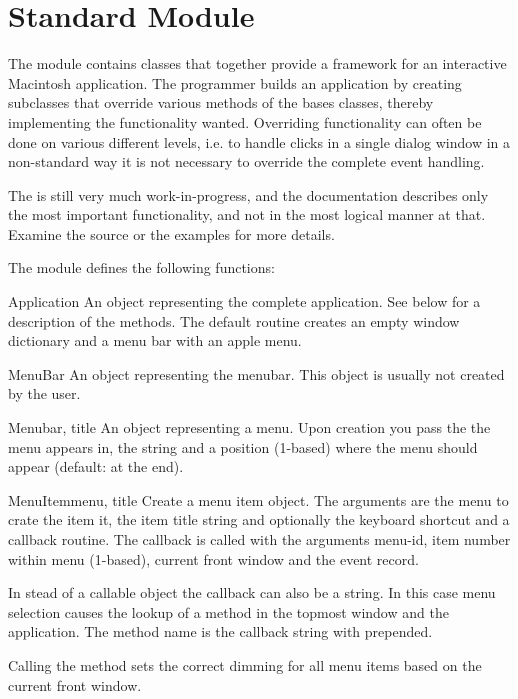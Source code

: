 \section{Standard Module }



The  module contains classes that together provide a
framework for an interactive Macintosh application. The programmer
builds an application by creating subclasses that override various
methods of the bases classes, thereby implementing the functionality
wanted. Overriding functionality can often be done on various
different levels, i.e. to handle clicks in a single dialog window in a
non-standard way it is not necessary to override the complete event
handling.

The  is still very much work-in-progress, and the
documentation describes only the most important functionality, and not
in the most logical manner at that. Examine the source or the examples
for more details.

The  module defines the following functions:


\begin{funcdesc}{Application}{}
An object representing the complete application. See below for a
description of the methods. The default  routine
creates an empty window dictionary and a menu bar with an apple menu.
\end{funcdesc}

\begin{funcdesc}{MenuBar}{}
An object representing the menubar. This object is usually not created
by the user.
\end{funcdesc}

\begin{funcdesc}{Menu}{bar, title}
An object representing a menu. Upon creation you pass the
 the menu appears in, the  string and a
position (1-based)  where the menu should appear (default:
at the end).
\end{funcdesc}

\begin{funcdesc}{MenuItem}{menu, title}
Create a menu item object. The arguments are the menu to crate the
item it, the item title string and optionally the keyboard shortcut
and a callback routine. The callback is called with the arguments
menu-id, item number within menu (1-based), current front window and
the event record.

In stead of a callable object the callback can also be a string. In
this case menu selection causes the lookup of a method in the topmost
window and the application. The method name is the callback string
with  prepended.

Calling the   method sets the
correct dimming for all menu items based on the current front window.
\end{funcdesc}

